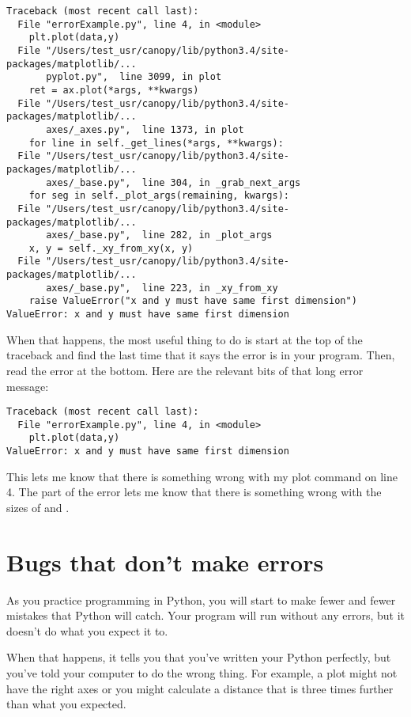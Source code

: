 \begin{Verbatim}
Traceback (most recent call last):
  File "errorExample.py", line 4, in <module>
    plt.plot(data,y)
  File "/Users/test_usr/canopy/lib/python3.4/site-packages/matplotlib/...
       pyplot.py",  line 3099, in plot
    ret = ax.plot(*args, **kwargs)
  File "/Users/test_usr/canopy/lib/python3.4/site-packages/matplotlib/...
       axes/_axes.py",  line 1373, in plot
    for line in self._get_lines(*args, **kwargs):
  File "/Users/test_usr/canopy/lib/python3.4/site-packages/matplotlib/...
       axes/_base.py",  line 304, in _grab_next_args
    for seg in self._plot_args(remaining, kwargs):
  File "/Users/test_usr/canopy/lib/python3.4/site-packages/matplotlib/...
       axes/_base.py",  line 282, in _plot_args
    x, y = self._xy_from_xy(x, y)
  File "/Users/test_usr/canopy/lib/python3.4/site-packages/matplotlib/...
       axes/_base.py",  line 223, in _xy_from_xy
    raise ValueError("x and y must have same first dimension")
ValueError: x and y must have same first dimension
\end{Verbatim}

When that happens, the most useful thing to do is start at the top of the traceback and find the last time that it says the error is in your program.  Then, read the error at the bottom.  Here are the relevant bits of that long error message:

\begin{Verbatim}
Traceback (most recent call last):
  File "errorExample.py", line 4, in <module>
    plt.plot(data,y)
ValueError: x and y must have same first dimension
\end{Verbatim}
This lets me know that there is something wrong with my plot command on line 4. The  part of the error lets me know that there is something wrong with the sizes of  and .

\section{Bugs that don't make errors}
As you practice programming in Python, you will start to make fewer and fewer mistakes that Python will catch.  Your program will run without any errors, but it doesn't do what you expect it to.

When that happens, it tells you that you've written your Python perfectly, but you've told your computer to do the wrong thing.  For example, a plot might not have the right axes or
you might calculate a distance that is three times further than what you expected.

